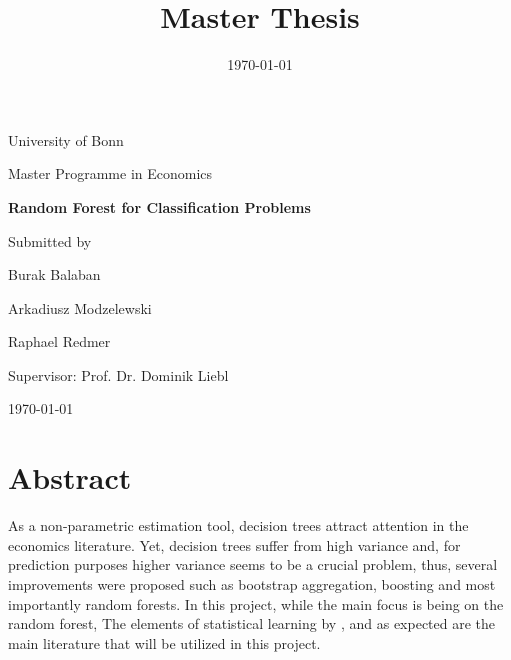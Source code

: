 \documentclass[ twoside=false, 12pt,  footinclude=true,  headinclude=true,  cleardoublepage=empty]{scrbook}
\title{Master Thesis}
\date{\today}
\begin{document}
	\begin{titlepage}
		\centering
		University of Bonn
		
		 Master Programme in Economics
		\vspace{1in}
		\vspace{1in}
		
		{\LARGE \bfseries  Random Forest for Classification Problems}
		\vspace{1in}
		
		{\large Submitted by}
		
		{\LARGE Burak Balaban \par
				Arkadiusz Modzelewski\par
				Raphael Redmer\par}
		
		\vspace{1in}
		
			Supervisor: Prof. Dr. Dominik Liebl
			
		\vfill
		
		\begin{flushleft}
			\today
		\end{flushleft}
		
	\end{titlepage}
	
	
	
	\frontmatter

\tableofcontents

\chapter*{Abstract}
As a non-parametric estimation tool, decision trees attract attention in the economics literature. Yet, decision trees suffer from high variance and, for prediction purposes higher variance seems to be a crucial problem, thus, several improvements were proposed such as bootstrap aggregation, boosting and most importantly random forests. In this project, while the main focus is being on the random forest, The elements of statistical learning by \cite{friedman2001elements} \cite{varian2014big} \cite{maimon2005data}, \cite{louppe2014understanding} and as expected \cite{breiman2001random} are the main literature that will be utilized in this project.
\end{document}
